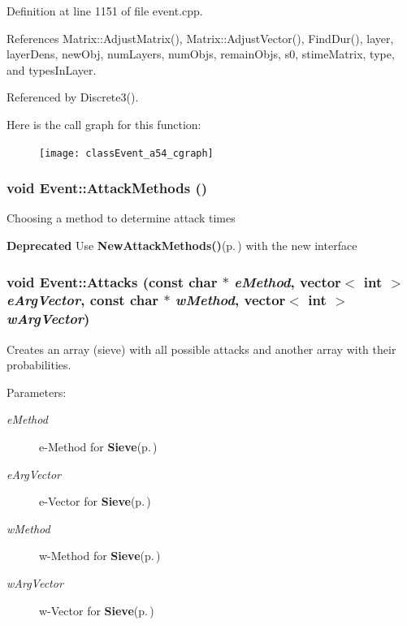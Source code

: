 Definition at line 1151 of file event.cpp.

References Matrix::Adjust\-Matrix(), Matrix::Adjust\-Vector(), Find\-Dur(), layer, layer\-Dens, new\-Obj, num\-Layers, num\-Objs, remain\-Objs, s0, stime\-Matrix, type, and types\-In\-Layer.

Referenced by Discrete3().

Here is the call graph for this function:\begin{figure}[H]
\begin{center}
\leavevmode
\texttt{[image: classEvent\_a54\_cgraph]}
\end{center}
\end{figure}
\subsubsection{\setlength{\rightskip}{0pt plus 5cm}void Event::Attack\-Methods ()}\label{classEvent_a33}


Choosing a method to determine attack times 

\begin{Desc}
\item[{\bf Deprecated}]Use {\bf New\-Attack\-Methods()}{\rm (p.\,\pageref{classEvent_a34})} with the new interface \end{Desc}
\subsubsection{\setlength{\rightskip}{0pt plus 5cm}void Event::Attacks (const char $\ast$ {\em e\-Method}, vector$<$ int $>$ {\em e\-Arg\-Vector}, const char $\ast$ {\em w\-Method}, vector$<$ int $>$ {\em w\-Arg\-Vector})}\label{classEvent_a38}


Creates an array (sieve) with all possible attacks and another array with their probabilities. \begin{Desc}
\item[Parameters:]
\begin{description}
\item[{\em e\-Method}]e-Method for {\bf Sieve}{\rm (p.\,\pageref{classSieve})} \item[{\em e\-Arg\-Vector}]e-Vector for {\bf Sieve}{\rm (p.\,\pageref{classSieve})} \item[{\em w\-Method}]w-Method for {\bf Sieve}{\rm (p.\,\pageref{classSieve})} \item[{\em w\-Arg\-Vector}]w-Vector for {\bf Sieve}{\rm (p.\,\pageref{classSieve})} \end{description}
\end{Desc}


